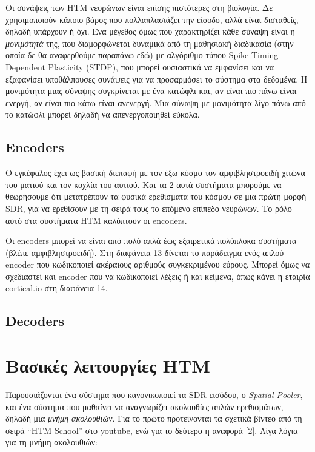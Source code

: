 Οι συνάψεις των HTM νευρώνων είναι επίσης πιστότερες στη βιολογία.
Δε χρησιμοποιούν κάποιο βάρος που πολλαπλασιάζει την είσοδο, αλλά είναι δισταθείς, δηλαδή υπάρχουν ή όχι.
Ένα μέγεθος όμως που χαρακτηρίζει κάθε σύναψη είναι η \emph{μονιμότητά} της, που διαμορφώνεται δυναμικά από τη μαθησιακή διαδικασία (στην οποία δε θα αναφερθούμε παραπάνω εδώ) με αλγόριθμο τύπου Spike Timing Dependent Plasticity (STDP), που μπορεί ουσιαστικά να εμφανίσει και να εξαφανίσει υποθάλπουσες συνάψεις για να προσαρμόσει το σύστημα στα δεδομένα.
Η μονιμότητα μιας σύναψης συγκρίνεται με ένα κατώφλι και, αν είναι πιο πάνω είναι ενεργή, αν είναι πιο κάτω είναι ανενεργή.
Μια σύναψη με μονιμότητα λίγο πάνω από το κατώφλι μπορεί δηλαδή να απενεργοποιηθεί εύκολα.


\subsection{Encoders}

Ο εγκέφαλος έχει ως βασική διεπαφή με τον έξω κόσμο τον αμφιβληστροειδή χιτώνα του ματιού και τον κοχλία του αυτιού.
Και τα 2 αυτά συστήματα μπορούμε να θεωρήσουμε ότι μετατρέπουν τα φυσικά ερεθίσματα του κόσμου σε μια πρώτη μορφή SDR, για να ερεθίσουν με τη σειρά τους το επόμενο επίπεδο νευρώνων.
Το ρόλο αυτό στα συστήματα HTM καλύπτουν οι encoders.

Οι encoders μπορεί να είναι από πολύ απλά έως εξαιρετικά πολύπλοκα συστήματα (βλέπε αμφιβληστροειδή).
Στη διαφάνεια 13 δίνεται το παράδειγμα ενός απλού encoder που κωδικοποιεί ακέραιους αριθμούς συγκεκριμένου εύρους.
Μπορεί όμως να σχεδιαστεί και encoder που να κωδικοποιεί λέξεις ή και κείμενα, όπως κάνει η εταιρία cortical.io \cite{semantic} στη διαφάνεια 14.


\subsection{Decoders}


\section{Βασικές λειτουργίες HTM}

Παρουσιάζονται ένα σύστημα που κανονικοποιεί τα SDR εισόδου, ο \emph{Spatial Pooler}, και ένα σύστημα που μαθαίνει να αναγνωρίζει ακολουθίες απλών ερεθισμάτων, δηλαδή μια \emph{μνήμη ακολουθιών}.
Για το πρώτο προτείνονται τα σχετικά βίντεο από τη σειρά ``HTM School'' στο youtube, ενώ για το δεύτερο η αναφορά [2].
Λίγα λόγια για τη μνήμη ακολουθιών:

